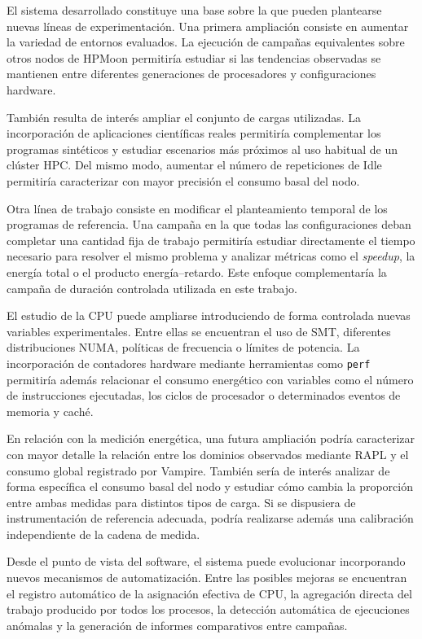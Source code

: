 El sistema desarrollado constituye una base sobre la que pueden plantearse nuevas líneas de experimentación. Una primera ampliación consiste en aumentar la variedad de entornos evaluados. La ejecución de campañas equivalentes sobre otros nodos de HPMoon permitiría estudiar si las tendencias observadas se mantienen entre diferentes generaciones de procesadores y configuraciones hardware.

También resulta de interés ampliar el conjunto de cargas utilizadas. La incorporación de aplicaciones científicas reales permitiría complementar los programas sintéticos y estudiar escenarios más próximos al uso habitual de un clúster HPC. Del mismo modo, aumentar el número de repeticiones de Idle permitiría caracterizar con mayor precisión el consumo basal del nodo.

Otra línea de trabajo consiste en modificar el planteamiento temporal de los programas de referencia. Una campaña en la que todas las configuraciones deban completar una cantidad fija de trabajo permitiría estudiar directamente el tiempo necesario para resolver el mismo problema y analizar métricas como el \emph{speedup}, la energía total o el producto energía--retardo. Este enfoque complementaría la campaña de duración controlada utilizada en este trabajo.

El estudio de la CPU puede ampliarse introduciendo de forma controlada nuevas variables experimentales. Entre ellas se encuentran el uso de SMT, diferentes distribuciones NUMA, políticas de frecuencia o límites de potencia. La incorporación de contadores hardware mediante herramientas como \texttt{perf} permitiría además relacionar el consumo energético con variables como el número de instrucciones ejecutadas, los ciclos de procesador o determinados eventos de memoria y caché.

En relación con la medición energética, una futura ampliación podría caracterizar con mayor detalle la relación entre los dominios observados mediante RAPL y el consumo global registrado por Vampire. También sería de interés analizar de forma específica el consumo basal del nodo y estudiar cómo cambia la proporción entre ambas medidas para distintos tipos de carga. Si se dispusiera de instrumentación de referencia adecuada, podría realizarse además una calibración independiente de la cadena de medida.

Desde el punto de vista del software, el sistema puede evolucionar incorporando nuevos mecanismos de automatización. Entre las posibles mejoras se encuentran el registro automático de la asignación efectiva de CPU, la agregación directa del trabajo producido por todos los procesos, la detección automática de ejecuciones anómalas y la generación de informes comparativos entre campañas.

